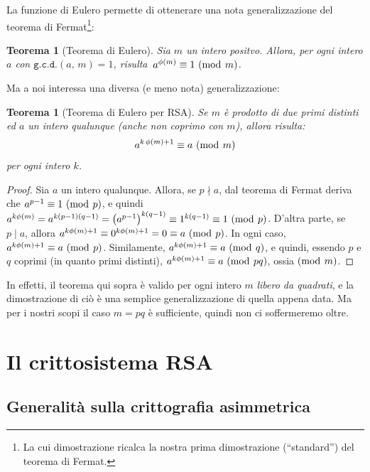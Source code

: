 \documentclass[pdflatex,11pt,a4paper,oneside]{article}
\newcommand{\p}[1]{\left({#1}\right)}
\newcommand{\ephi}[1]{\ensuremath{\phi\p{#1}}}
\newcommand{\divides}[0]{\mid}
\newcommand{\notdivides}[0]{\nmid}
\newcommand{\congruent}[0]{\equiv}
\newcommand{\mmodop}[0]{\ensuremath{\operatorname{mod}}}
\newcommand{\mmod}[1]{\ensuremath{\allowbreak\ (\mmodop\:{#1})}}
\newcommand{\gcdop}[0]{\ensuremath{\mathtt{g.c.d.}}}
\newcommand{\xgcd}[1]{\ensuremath{\gcdop\left({#1}\right)}}
\renewcommand{\gcd}[2]{\xgcd{{#1},\,{#2}}}
\newtheorem{theorem}[TheoremLike]{Teorema}
\begin{document}
La funzione di Eulero permette di ottenerare una nota generalizzazione
del teorema di Fermat\footnote{La cui dimostrazione ricalca la nostra
prima dimostrazione (``standard'') del teorema di Fermat.}:

\begin{theorem}[Teorema di Eulero]\label{thm:euler}
Sia $m$ un intero positvo. Allora, per ogni intero $a$ con
$\gcd{a}{m} = 1$, risulta\, $a^{\ephi{m}} \congruent 1 \mmod m$.
\end{theorem}

\noindent
Ma a noi interessa una diversa (e meno nota) generalizzazione:

\begin{theorem}[Teorema di Eulero per RSA]\label{thm:euler-rsa}
Se $m$ \`e prodotto di due primi \emph{distinti} ed $a$ un intero
qualunque (anche non coprimo con $m$), allora risulta:
  $$ a^{k\,\ephi{m} + 1} \congruent a \mmod m $$
per ogni intero $k$.
\end{theorem}
%
\begin{proof}
Sia $a$ un intero qualunque.  Allora, se $p \notdivides a$, dal teorema
di Fermat deriva che $a^{p-1} \congruent 1 \mmod p$, e quindi
$a^{k\ephi{m}} = a^{k(p-1)(q-1)} = {\p{a^{p-1}}}^{k(q-1)} \congruent
1^{k(q-1)} \congruent 1 \mmod p$.  D'altra parte, se $p \divides a$,
allora $a^{k\ephi{m} + 1} \congruent 0^{k\ephi{m} + 1} = 0 \congruent a
\mmod p$. In ogni caso, $a^{k\ephi{m} + 1} \congruent a \mmod p$.
Similamente, $a^{k\ephi{m} + 1} \congruent a \mmod q$, e quindi, essendo
$p$ e $q$ coprimi (in quanto primi distinti), $a^{k\ephi{m} + 1}
\congruent a \mmod{pq}$,
ossia$\mmod m$. %
\end{proof}

In effetti, il teorema qui sopra \`e valido per ogni intero $m$
\emph{libero da quadrati}, e la dimostrazione di ci\`o \`e una
semplice generalizzazione di quella appena data.  Ma per i nostri
scopi il caso $m = pq$ \`e sufficiente, quindi non ci soffermeremo
oltre.


\section{Il crittosistema RSA}

\subsection{Generalit\`a sulla crittografia asimmetrica}
\end{document}
